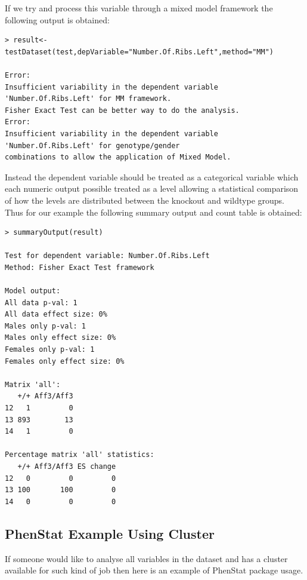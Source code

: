 \documentclass[12pt,a4paper]{article}
\begin{document}
If we try and process this variable through a mixed model framework the following output is obtained: 


\begingroup
    \fontsize{8pt}{12pt}\selectfont
\begin{verbatim}
> result<-testDataset(test,depVariable="Number.Of.Ribs.Left",method="MM")

Error:
Insufficient variability in the dependent variable 'Number.Of.Ribs.Left' for MM framework. 
Fisher Exact Test can be better way to do the analysis.
Error:
Insufficient variability in the dependent variable 'Number.Of.Ribs.Left' for genotype/gender 
combinations to allow the application of Mixed Model.
\end{verbatim}
\endgroup 

Instead the dependent variable should be treated as a categorical variable which each numeric output possible treated as a level allowing 
a statistical comparison of how the levels are distributed between the knockout and wildtype groups.  
Thus for our example the following summary output and count table is obtained: 

\begingroup
    \fontsize{8pt}{12pt}\selectfont
\begin{verbatim}
> summaryOutput(result)

Test for dependent variable: Number.Of.Ribs.Left
Method: Fisher Exact Test framework

Model output:
All data p-val: 1
All data effect size: 0%
Males only p-val: 1
Males only effect size: 0%
Females only p-val: 1
Females only effect size: 0%

Matrix 'all':
   +/+ Aff3/Aff3
12   1         0
13 893        13
14   1         0

Percentage matrix 'all' statistics:
   +/+ Aff3/Aff3 ES change
12   0         0         0
13 100       100         0
14   0         0         0

\end{verbatim}
\endgroup 


\subsection{PhenStat Example Using Cluster}
If someone would like to analyse all variables in the dataset and has a cluster available for such kind of job then here is an example of PhenStat package usage.
\end{document}
